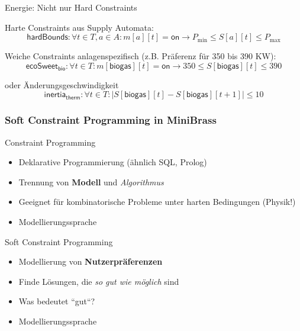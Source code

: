 \begin{frame}{Energie: Nicht nur Hard Constraints}

\alert{Harte} Constraints aus Supply Automata:
\begin{equation}
\mathsf{hardBounds}: \forall t \in T, a \in A : m[a][t] = \mathsf{on} \rightarrow P_{\mathrm{min}} \leq S[a][t] \leq P_{\mathrm{max}} \nonumber
\end{equation}

\pause
\vspace*{2ex}
\alert{Weiche} Constraints anlagenspezifisch (z.B. Präferenz für 350 bis 390 KW):
\begin{equation}
\mathsf{ecoSweet}_{\mathsf{bio}}: \forall t \in T : m[\mathsf{biogas}][t] = \mathsf{on} \rightarrow 350 \leq S[\mathsf{biogas}][t] \leq 390 \nonumber
\end{equation}

\pause
\vspace*{2ex}
oder Änderungsgeschwindigkeit
\begin{equation}
\mathsf{inertia}_{\mathsf{therm}}: \forall t \in T : |S[\mathsf{biogas}][t] - S[\mathsf{biogas}][t+1] | \leq 10 \nonumber
\end{equation}
\end{frame}

\begin{frame}
    \frametitle{Soft Constraint Programming in MiniBrass}
 \alert{Constraint Programming}
    \begin{itemize}
    \item Deklarative Programmierung (ähnlich SQL, Prolog)
    \item Trennung von \textbf{Modell} und \emph{Algorithmus}
    \item Geeignet für kombinatorische Probleme unter harten Bedingungen (Physik!)
    \item Modellierungssprache 
    \end{itemize}

    \vspace*{3ex}
    
\alert{Soft Constraint Programming}
    \begin{itemize} 
    \item Modellierung von \textbf{Nutzerpräferenzen}
    \item Finde Lösungen, die \emph{so gut wie möglich} sind
    \item Was bedeutet ``gut``?
    \item Modellierungssprache 
     \end{itemize}
\end{frame}

